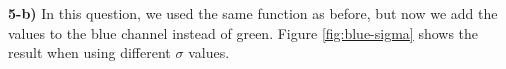 \documentclass[12pt,a4paper]{article}
\begin{document}
\newpage

\textbf{5-b) } In this question, we used the same function as before, but now we add the values to the blue channel instead of green. Figure \ref{fig:blue-sigma} shows the result when using different $\sigma$ values. \\

\begin{figure}[!h]%
	\centering
	\quad
	\quad

\end{figure}
\end{document}
